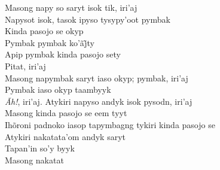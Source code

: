 \bigskip

\begin{linenumbers}\begingroup\raggedright
\noindent Masong napy so saryt isok tik, iri'aj\\
Napysot isok, tasok ipyso tysypy'oot pymbak\\
Kinda pasojo se okyp\\
Pymbak pymbak ko’ãj̃ty\\
Apip pymbak kinda pasojo sety\\
Pitat, iri'aj\\
Masong napymbak saryt iaso okyp; pymbak, iri'aj\\
Pymbak iaso okyp taambyyk\\
\emph{Ãh!}, iri'aj. Atykiri napyso andyk isok pysodn, iri'aj\\
Masong kinda pasojo se eem tyyt\\
Ihõroni padnoko iasop tapymbagng tykiri kinda pasojo se\\
Atykiri nakatata'om andyk saryt\\
Tapan'in so'y byyk\\
Masong nakatat

\end{linenumbers}\endgroup

\bigskip

